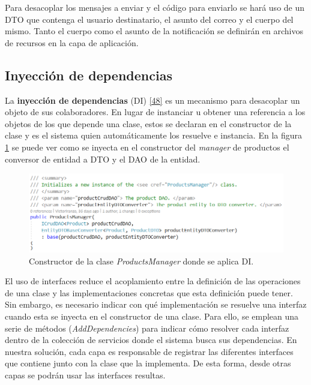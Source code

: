 \documentclass[11pt,spanish,listoffigures]{tfgetsinf}
\begin{document}
Para desacoplar los mensajes a enviar y el código para enviarlo se hará uso de un DTO que contenga el usuario destinatario, el asunto del correo y el cuerpo del mismo. Tanto el cuerpo como el asunto de la notificación se definirán en archivos de recursos en la capa de aplicación.

\subsection{Inyección de dependencias}

La \textbf{inyección de dependencias} (DI) \hyperlink{page.80}{[48]} es un mecanismo para desacoplar un objeto de sus colaboradores. En lugar de instanciar u obtener una referencia a los objetos de los que depende una clase, estos se declaran en el constructor de la clase y es el sistema quien automáticamente los resuelve e instancia. En la figura \ref{fig:ProductsManager} se puede ver como se inyecta en el constructor del \textit{manager} de productos el conversor de entidad a DTO y el DAO de la entidad.

\begin{figure}[h]
\centering
\includegraphics[scale=0.8]{ProductsManager}
\caption{Constructor de la clase \textit{ProductsManager} donde se aplica DI.}
\label{fig:ProductsManager}
\end{figure}

El uso de interfaces reduce el acoplamiento entre la definición de las operaciones de una clase y las implementaciones concretas que esta definición puede tener. Sin embargo, es necesario indicar con qué implementación se resuelve una interfaz cuando esta se inyecta en el constructor de una clase. Para ello, se emplean una serie de métodos (\textit{AddDependencies}) para indicar cómo resolver cada interfaz dentro de la colección de servicios donde el sistema busca sus dependencias. En nuestra solución, cada capa es responsable de registrar las diferentes interfaces que contiene junto con la clase que la implementa. De esta forma, desde otras capas se podrán usar las interfaces resultas.

\newpage
\end{document}
